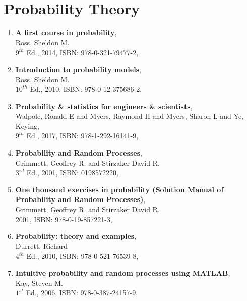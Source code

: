 \documentclass{article}
\begin{document}
\section{Probability Theory}
%
\begin{enumerate}
%
\item{%
    \textbf{A first course in probability},\\[2pt]
     Ross, Sheldon M.\\
     $9^{th}$ Ed., 2014, ISBN: 978-0-321-79477-2,
     }
%
\item{%
    \textbf{Introduction to probability models},\\[2pt]
     Ross, Sheldon M.\\
     $10^{th}$ Ed., 2010, ISBN: 978-0-12-375686-2,
     }
%
\item{%
	\textbf{Probability \& statistics for engineers \& scientists},\\[2pt]
	Walpole, Ronald E and Myers, Raymond H and Myers, Sharon L and Ye, Keying,\\
	$9^{th}$ Ed., 2017, ISBN: 978-1-292-16141-9,
	}
%
\item{%
	\textbf{Probability and Random Processes},\\[2pt]
	Grimmett, Geoffrey R. and Stirzaker David R.\\
	$3^{rd}$ Ed., 2001, ISBN: 0198572220,
	}
%
\item{%
	\textbf{One thousand exercises in probability (Solution Manual of Probability and Random Processes)},\\[2pt]
	Grimmett, Geoffrey R. and Stirzaker David R.\\
	2001, ISBN: 978-0-19-857221-3,
	}	
%
\item{%
    \textbf{Probability: theory and examples},\\[2pt]
     Durrett, Richard\\
     $4^{th}$ Ed., 2010, ISBN: 978-0-521-76539-8,
     }
%
\item{%
    \textbf{Intuitive probability and random processes using MATLAB},\\[2pt]
     Kay, Steven M.\\
     $1^{st}$ Ed., 2006, ISBN: 978-0-387-24157-9,
     } 
%	
\end{enumerate}
\end{document}
